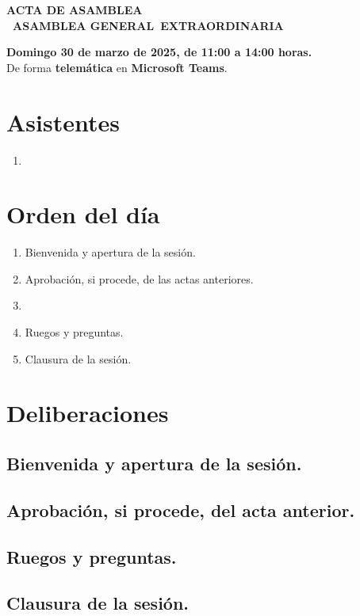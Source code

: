 \documentclass[a4paper,12pt]{article}
\newcommand{\assemblyType}{Extraordinaria}
\newcommand{\assemblyDate}{Domingo 30 de marzo de 2025, de 11:00 a 14:00 horas.}
\newcommand{\assemblyPresence}{telemática}
\newcommand{\assemblyUbication}{Microsoft Teams}
\newcommand{\assemblyNumber}{1} %
\newcommand{\assemblyName}{\Romannum{\assemblyNumber}~Asamblea General~\assemblyType}
\newcommand{\subject}{ACTA  DE ASAMBLEA \\ \MakeUppercase{\assemblyName}}
\begin{document}
\begin{center}
    \large \textbf{\subject}
\end{center}

\begin{center}
    \textbf{\assemblyDate}\\
    De forma \textbf{\assemblyPresence} en \textbf{\assemblyUbication}.
\end{center}

\vspace{0.5cm}

\tableofcontents
\newpage
{}

\section{Asistentes}

\begin{multicols}{2}
\begin{enumerate}
    \item[]
\end{enumerate}
\end{multicols}

\section{Orden del día}

\begin{enumerate}
    \item Bienvenida y apertura de la sesión.
    \item Aprobación, si procede, de las actas anteriores.
    \item
    \item Ruegos y preguntas.
    \item Clausura de la sesión.
\end{enumerate}

\section{Deliberaciones}

\subsection{Bienvenida y apertura de la sesión.}

\subsection{Aprobación, si procede, del acta anterior.}

\subsection{}

\subsection{Ruegos y preguntas.}

\subsection{Clausura de la sesión.}

\firma
\end{document}
